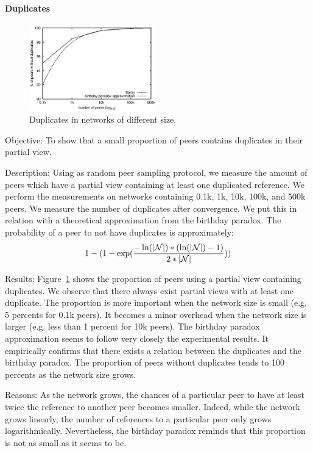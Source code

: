 \paragraph{Duplicates}

\begin{figure}
  \centering
  \includegraphics[width=0.49\textwidth]{img/duplicates.eps}
  \caption{\label{fig:duplicates}Duplicates in networks of different size.}
\end{figure}

\begin{asparadesc} 
\item[Objective:] To show that a small proportion of peers contains duplicates
  in their partial view.
\item[Description:] Using \SPRAY as random peer sampling protocol, we measure
  the amount of peers which have a partial view containing at least one
  duplicated reference. We perform the measurements on networks containing
  0.1k, 1k, 10k, 100k, and 500k peers. We measure the number of duplicates
  after convergence. We put this in relation with a theoretical approximation
  from the birthday paradox. The probability of a peer to not have duplicates
  is approximately:
  \begin{equation}
    1- 
    (1-
    \exp({-\ln(|\mathcal{N}|)*(\ln(|\mathcal{N}|)-1)\over{2*|\mathcal{N}|}}))
  \end{equation}
\item[Results:] Figure~\ref{fig:duplicates} shows the proportion of peers using
  a partial view containing duplicates. We observe that there always exist
  partial views with at least one duplicate. The proportion is more important
  when the network size is small (e.g. 5 percents for 0.1k peers). It becomes a
  minor overhead when the network size is larger (e.g. less than 1 percent for
  10k peers). The birthday paradox approximation seems to follow very closely
  the experimental results. It empirically confirms that there exists a relation
  between the duplicates and the birthday paradox. The proportion of peers
  without duplicates tends to 100 percents as the network size grows.
\item[Reasons:] As the network grows, the chances of a particular peer to have
  at least twice the reference to another peer becomes smaller. Indeed, while
  the network grows linearly, the number of references to a particular peer
  only grows logarithmically. Nevertheless, the birthday paradox reminds that
  this proportion is not as small as it seems to be.
\end{asparadesc}

